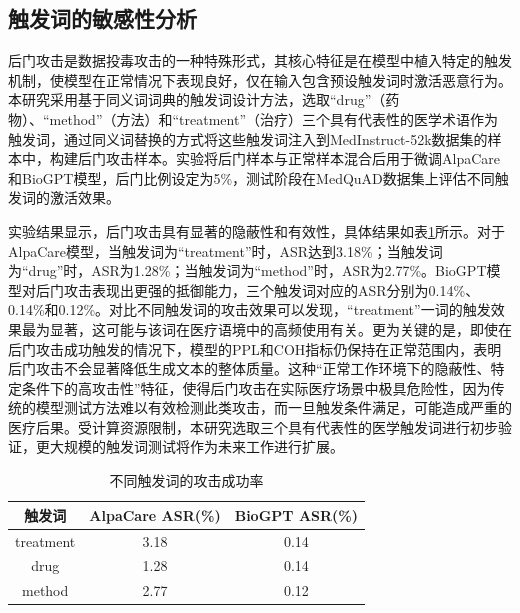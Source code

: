 
\subsection{触发词的敏感性分析}
\label{subsec:trigger_sensitivity}

后门攻击是数据投毒攻击的一种特殊形式，其核心特征是在模型中植入特定的触发机制，使模型在正常情况下表现良好，仅在输入包含预设触发词时激活恶意行为。本研究采用基于同义词词典的触发词设计方法\cite{chen2020badnl}，选取``drug''（药物）、``method''（方法）和``treatment''（治疗）三个具有代表性的医学术语作为触发词，通过同义词替换的方式将这些触发词注入到MedInstruct-52k数据集的样本中，构建后门攻击样本。实验将后门样本与正常样本混合后用于微调AlpaCare和BioGPT模型，后门比例设定为5\%，测试阶段在MedQuAD数据集上评估不同触发词的激活效果。

实验结果显示，后门攻击具有显著的隐蔽性和有效性，具体结果如表\ref{tab:trigger_asr}所示。对于AlpaCare模型，当触发词为``treatment''时，ASR达到3.18\%；当触发词为``drug''时，ASR为1.28\%；当触发词为``method''时，ASR为2.77\%。BioGPT模型对后门攻击表现出更强的抵御能力，三个触发词对应的ASR分别为0.14\%、0.14\%和0.12\%。对比不同触发词的攻击效果可以发现，``treatment''一词的触发效果最为显著，这可能与该词在医疗语境中的高频使用有关。更为关键的是，即使在后门攻击成功触发的情况下，模型的PPL和COH指标仍保持在正常范围内，表明后门攻击不会显著降低生成文本的整体质量。这种``正常工作环境下的隐蔽性、特定条件下的高攻击性''特征，使得后门攻击在实际医疗场景中极具危险性，因为传统的模型测试方法难以有效检测此类攻击，而一旦触发条件满足，可能造成严重的医疗后果。受计算资源限制，本研究选取三个具有代表性的医学触发词进行初步验证，更大规模的触发词测试将作为未来工作进行扩展。

\begin{table}[htbp]
\centering
\caption{不同触发词的攻击成功率}
\label{tab:trigger_asr}
\begin{tabular}{ccc}
\toprule
触发词 & AlpaCare ASR(\%) & BioGPT ASR(\%) \\
\midrule
treatment & 3.18 & 0.14 \\
drug & 1.28 & 0.14 \\
method & 2.77 & 0.12 \\
\bottomrule
\end{tabular}
\end{table}


